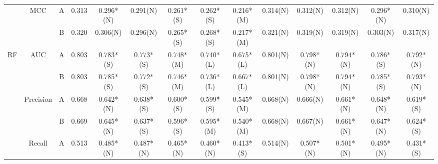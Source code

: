 \begin{table*}
{\begin{tabular}{|c|c|c|c|c|c|c|c|c|c|c|c|c|c|}
                      & \multirow{2}{*}{MCC}       & A                                                                             & 0.313         & 0.296*(N)            & 0.291(N)         & 0.261*(S)       & 0.262*(S)       & 0.216*(M)         & 0.314(N)        & 0.312(N)       & 0.312(N)       & 0.296*(N)        & 0.310(N)       \\ \cline{3-14} 
                      &                            & B                                                                             & 0.320          & 0.306(N)             & 0.296(N)         & 0.265*(S)       & 0.268*(S)       & 0.217*(M)         & 0.321(N)        & 0.319(N)       & 0.319(N)       & 0.303(N)         & 0.317(N)      \\ \hline
\multirow{10}{*}{RF}  & \multirow{2}{*}{AUC}       & A                                                                             & 0.803         & 0.783*(S)            & 0.773*(S)        & 0.748*(M)       & 0.740*(L)        & 0.675*(L)         & 0.801(N)        & 0.798*(N)      & 0.794*(N)      & 0.786*(S)        & 0.792*(N)     \\ \cline{3-14} 
                      &                            & B                                                                             & 0.803         & 0.785*(S)            & 0.772*(S)        & 0.746*(M)       & 0.736*(L)       & 0.667*(L)         & 0.801(N)        & 0.798*(N)      & 0.794*(N)      & 0.785*(S)        & 0.793*(N)     \\ \cline{2-14} 
                      & \multirow{2}{*}{Precision} & A                                                                             & 0.668         & 0.642*(N)            & 0.638*(S)        & 0.600*(S)         & 0.599*(S)       & 0.545*(M)         & 0.668(N)        & 0.666(N)       & 0.661*(N)      & 0.648*(N)        & 0.619*(S)     \\ \cline{3-14} 
                      &                            & B                                                                             & 0.669         & 0.645*(N)            & 0.637*(S)        & 0.596*(S)       & 0.595*(M)       & 0.540*(M)          & 0.668(N)        & 0.667(N)       & 0.661*(N)      & 0.647*(N)        & 0.624*(S)     \\ \cline{2-14} 
                      & \multirow{2}{*}{Recall}    & A                                                                             & 0.513         & 0.485*(N)            & 0.487*(N)        & 0.465*(N)       & 0.460*(N)        & 0.413*(S)         & 0.514(N)        & 0.507*(N)      & 0.501*(N)      & 0.495*(N)        & 0.431*(S)     \\ \cline{3-14} 

\end{tabular}}
\end{table*}
